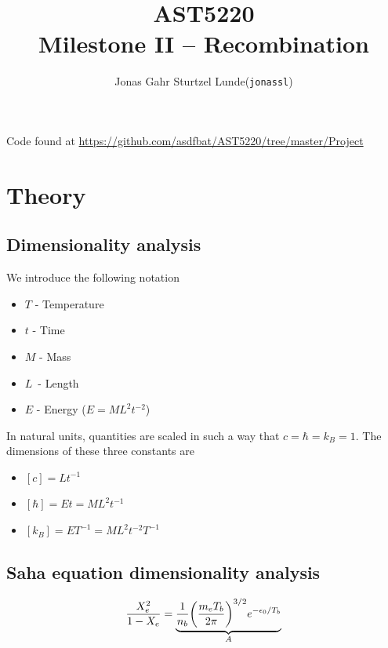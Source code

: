 \documentclass[10pt, a4paper]{article}
\begin{document}
\title{AST5220\\ Milestone II -- Recombination}
\author{
    \begin{tabular}{r l}
        Jonas Gahr Sturtzel Lunde & (\texttt{jonassl})
    \end{tabular}}

\maketitle
Code found at \url{https://github.com/asdfbat/AST5220/tree/master/Project}
\vspace{0.7cm}

\section{Theory}

\subsection{Dimensionality analysis}
We introduce the following notation
\begin{itemize}
    \item $T$ - Temperature
    \item $t$ - Time
    \item $M$ - Mass
    \item $L$ - Length
    \item $E$ - Energy ($E = ML^2t^{-2}$)
\end{itemize}

In natural units, quantities are scaled in such a way that $c = \hbar = k_B = 1$. The dimensions of these three constants are
\begin{itemize}
    \item $[c] = Lt^{-1}$
    \item $[\hbar] = Et = ML^2t^{-1}$
    \item $[k_B] = ET^{-1} = ML^2t^{-2}T^{-1}$
\end{itemize}

\subsection{Saha equation dimensionality analysis}
\begin{equation}
    \frac{X_{e}^{2}}{1-X_{e}}= \underbrace{\frac{1}{n_{b}}\qty(\frac{m_{e} T_{b}}{2 \pi})^{3 / 2} e^{-\epsilon_{0} / T_{b}}}_A
\end{equation}
\end{document}
